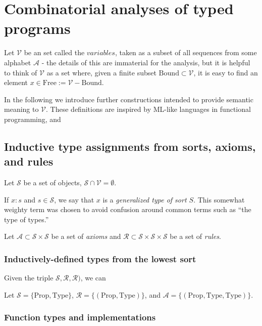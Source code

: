 \section{Combinatorial analyses of typed programs}

Let $\mathcal{V}$ be an set called the $variables$, taken as a subset of all sequences from some alphabet $\mathcal{A}$ - the details of this are immaterial for the analysis, but it is helpful to think of $\mathcal{V}$ as a set where, given a finite subset $\mathrm{Bound}\subset\mathcal{V}$, it is easy to find an element $x\in \mathrm{Free} := \mathcal{V} - \mathrm{Bound}$.

In the following we introduce further constructions intended to provide semantic meaning to $\mathcal{V}$. These definitions are inspired by ML-like languages in functional programming, and %

\subsection{Inductive type assignments from sorts, axioms, and rules}

Let $\mathcal{S}$ be a set of objects, $\mathcal{S}\cap\mathcal{V}=\emptyset$. 

If $x : s$ and $s\in\mathcal{S}$, we say that $x$ is a \emph{generalized type of sort $S$}. This somewhat weighty term was chosen to avoid confusion around common terms such as ``the type of types.''

Let $\mathcal{A}\subset\mathcal{S}\times\mathcal{S}$ be a set of \emph{axioms} and $\mathcal{R}\subset\mathcal{S}\times\mathcal{S}\times\mathcal{S}$ be a set of \emph{rules}.

\subsubsection{Inductively-defined types from the lowest sort}

Given the triple $\mathcal{S},\mathcal{R},\mathcal{R})$, we can 

\begin{example}
    Let $\mathcal{S} = \{\mathrm{Prop},\mathrm{Type}\}$, $\mathcal{R} = \{(\mathrm{Prop},\mathrm{Type})\}$, and $\mathcal{A} = \{(\mathrm{Prop},\mathrm{Type},\mathrm{Type})\}$.
\end{example}

\subsubsection{Function types and implementations}

